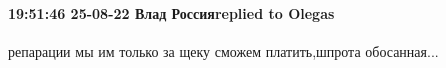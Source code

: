  
 
 
 
 

\paragraph{19:51:46 25-08-22 Влад Россияreplied to Olegas}

репарации мы им только за щеку сможем платить,шпрота обосанная...
